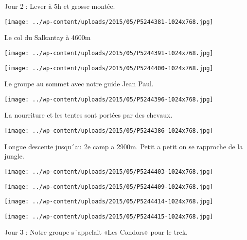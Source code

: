  \newline
 Jour 2 : \newline
 Lever à 5h et grosse montée. \newline
 \newline
\centerline{\texttt{[image: ../wp-content/uploads/2015/05/P5244381-1024x768.jpg]} } 
 \newline
 Le col du Salkantay à 4600m \newline
 \newline
\centerline{\texttt{[image: ../wp-content/uploads/2015/05/P5244391-1024x768.jpg]} } 
 \newline
 \newline
\centerline{\texttt{[image: ../wp-content/uploads/2015/05/P5244400-1024x768.jpg]} } 
 \newline
 Le groupe au sommet avec notre guide Jean Paul. \newline
 \newline
\centerline{\texttt{[image: ../wp-content/uploads/2015/05/P5244396-1024x768.jpg]} } 
 \newline
 La nourriture et les tentes sont portées par des chevaux. \newline
 \newline
\centerline{\texttt{[image: ../wp-content/uploads/2015/05/P5244386-1024x768.jpg]} } 
 \newline
 Longue descente jusqu´au 2e camp a 2900m. Petit a petit on se rapproche de la jungle. \newline
 \newline
\centerline{\texttt{[image: ../wp-content/uploads/2015/05/P5244403-1024x768.jpg]} } 
 \newline
 \newline
\centerline{\texttt{[image: ../wp-content/uploads/2015/05/P5244409-1024x768.jpg]} } 
 \newline
 \newline
\centerline{\texttt{[image: ../wp-content/uploads/2015/05/P5244414-1024x768.jpg]} } 
 \newline
 \newline
\centerline{\texttt{[image: ../wp-content/uploads/2015/05/P5244415-1024x768.jpg]} } 
 \newline
 Jour 3 : \newline
 Notre groupe s´appelait «Les Condors» pour le trek. \newline
 \newline
